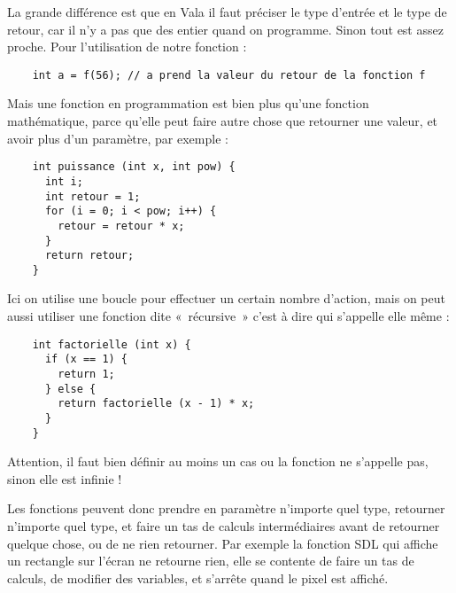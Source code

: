   La grande différence est que en Vala il faut préciser le type d'entrée et le type de retour, car il n'y a pas que des entier quand on programme. Sinon tout est assez proche. Pour l'utilisation de notre fonction :
  \begin{lstlisting}
    int a = f(56); // a prend la valeur du retour de la fonction f
  \end{lstlisting}
  
  Mais une fonction en programmation est bien plus qu'une fonction mathématique, parce qu'elle peut faire autre chose que retourner une valeur, et avoir plus d'un paramètre, par exemple :
  \begin{lstlisting}
    int puissance (int x, int pow) {
      int i;
      int retour = 1;
      for (i = 0; i < pow; i++) {
        retour = retour * x;
      }
      return retour;
    }
  \end{lstlisting}
  
  Ici on utilise une boucle pour effectuer un certain nombre d'action, mais on peut aussi utiliser une fonction dite «~récursive~» c'est à dire qui s'appelle elle même : 
  \begin{lstlisting}
    int factorielle (int x) {
      if (x == 1) { 
        return 1;
      } else {
        return factorielle (x - 1) * x;
      }
    }
  \end{lstlisting}
  
  Attention, il faut bien définir au moins un cas ou la fonction ne s'appelle pas, sinon elle est infinie !
  
  Les fonctions peuvent donc prendre en paramètre n'importe quel type, retourner n'importe quel type, et faire un tas de calculs intermédiaires avant de retourner quelque chose, ou de ne rien retourner. Par exemple la fonction SDL qui affiche un rectangle sur l'écran ne retourne rien, elle se contente de faire un tas de calculs, de modifier des variables, et s'arrête quand le pixel est affiché.
